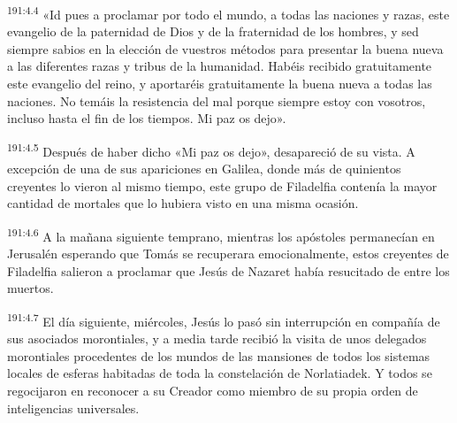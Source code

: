 \par 
\textsuperscript{191:4.4} «Id pues a proclamar por todo el mundo, a todas las naciones y razas, este evangelio de la paternidad de Dios y de la fraternidad de los hombres, y sed siempre sabios en la elección de vuestros métodos para presentar la buena nueva a las diferentes razas y tribus de la humanidad. Habéis recibido gratuitamente este evangelio del reino, y aportaréis gratuitamente la buena nueva a todas las naciones. No temáis la resistencia del mal porque siempre estoy con vosotros, incluso hasta el fin de los tiempos. Mi paz os dejo».

\par 
\textsuperscript{191:4.5} Después de haber dicho «Mi paz os dejo», desapareció de su vista. A excepción de una de sus apariciones en Galilea, donde más de quinientos creyentes lo vieron al mismo tiempo, este grupo de Filadelfia contenía la mayor cantidad de mortales que lo hubiera visto en una misma ocasión.

\par 
\textsuperscript{191:4.6} A la mañana siguiente temprano, mientras los apóstoles permanecían en Jerusalén esperando que Tomás se recuperara emocionalmente, estos creyentes de Filadelfia salieron a proclamar que Jesús de Nazaret había resucitado de entre los muertos.

\par 
\textsuperscript{191:4.7} El día siguiente, miércoles, Jesús lo pasó sin interrupción en compañía de sus asociados morontiales, y a media tarde recibió la visita de unos delegados morontiales procedentes de los mundos de las mansiones de todos los sistemas locales de esferas habitadas de toda la constelación de Norlatiadek. Y todos se regocijaron en reconocer a su Creador como miembro de su propia orden de inteligencias universales.

